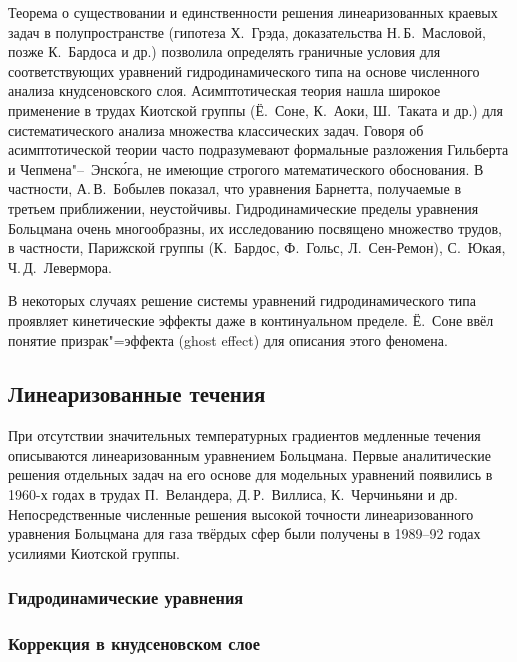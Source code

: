 Теорема о существовании и единственности решения линеаризованных краевых задач в полупространстве
(гипотеза Х.~Грэда, доказательства Н.\,Б.~Масловой, позже К.~Бардоса и др.)
позволила определять граничные условия для соответствующих уравнений гидродинамического типа
на основе численного анализа кнудсеновского слоя.
Асимптотическая теория нашла широкое применение в трудах Киотской группы
(Ё.~Соне, К.~Аоки, Ш.~Таката и др.) для систематического анализа множества классических задач.
Говоря об асимптотической теории часто подразумевают формальные разложения Гильберта и Чепмена"--~Энск\'{о}га,
не имеющие строгого математического обоснования. В частности, А.\,В.~Бобылев показал,
что уравнения Барнетта, получаемые в третьем приближении, неустойчивы.
Гидродинамические пределы уравнения Больцмана очень многообразны, их исследованию
посвящено множество трудов, в частности, Парижской группы (К.~Бардос, Ф.~Гольс, Л.~Сен-Ремон),
С.~Юкая, Ч.\,Д.~Левермора.

В некоторых случаях решение системы уравнений гидродинамического типа
проявляет кинетические эффекты даже в континуальном пределе.
Ё.~Соне ввёл понятие призрак"=эффекта (ghost effect) для описания этого феномена.


\subsection{Линеаризованные течения}

При отсутствии значительных температурных градиентов медленные течения описываются
линеаризованным уравнением Больцмана. Первые аналитические решения отдельных задач на его основе
для модельных уравнений появились в 1960-х годах в трудах П.~Веландера, Д.\,Р.~Виллиса, К.~Черчиньяни и др.
Непосредственные численные решения высокой точности линеаризованного уравнения Больцмана
для газа твёрдых сфер были получены в 1989--92 годах усилиями Киотской группы.

\subsubsection{Гидродинамические уравнения}
\subsubsection{Коррекция в кнудсеновском слое}


